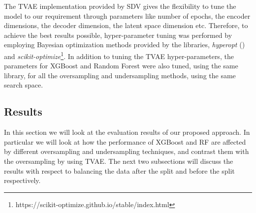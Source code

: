 \documentclass[twoside,11pt]{article}
\begin{document}
The TVAE implementation provided by SDV gives the flexibility to tune the model to our requirement through parameters like number of epochs, the encoder dimensions, the decoder dimension, the latent space dimension etc. Therefore, to achieve the best results possible, hyper-parameter tuning was performed by employing Bayesian optimization methods provided by the libraries, \emph{hyperopt} (\citealp{bergstraMakingScienceModel}) and \emph{scikit-optimize}\footnote{https://scikit-optimize.github.io/stable/index.html}. In addition to tuning the TVAE hyper-parameters, the parameters for XGBoost and Random Forest were also tuned, using the same library, for all the oversampling and undersampling methods, using the same search space.

\subsection{Results}
In this section we will look at the evaluation results of our proposed approach. In particular we will look at how the performance of XGBoost and RF are affected by different oversampling and undersampling techniques, and contrast them with the oversampling by using TVAE. The next two subsections will discuss the results with respect to balancing the data after the split and before the split respectively.
\end{document}
